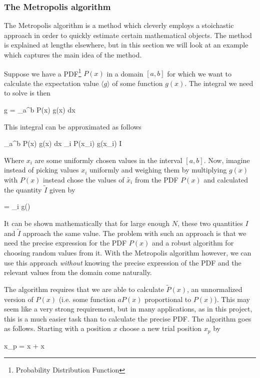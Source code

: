 \subsubsection{The Metropolis algorithm} \label{sec:theory_metropolis}

The Metropolis algorithm is a method which cleverly employs a stoichastic approach in order to quickly estimate certain mathematical objects.
The method is explained at lengths elsewhere\cite{lecturenotes}, but in this section we will look at an example which captures the main idea of the method.

Suppose we have a PDF\footnote{Probability Distribution Function} $P(x)$ in a domain $[a,b]$ for which we want to calculate the expectation value $\langle g \rangle$ of some function $g(x)$. 
The integral we need to solve is then 

\eqs
\langle g \rangle = \int_a^b P(x) g(x) dx 
\eqf

This integral can be approximated as follows

\eqs
\int_a^b P(x) g(x) dx \approx {} \sum_i P(x_i) g(x_i) \equiv I 
\eqf

Where $x_i$ are some uniformly chosen values in the interval $[a,b]$. 
Now, imagine instead of picking values $x_i$ uniformly and weighing them by multiplying $g(x)$ with $P(x)$ instead chose the values of $\tilde{x_i}$ from the PDF $P(x)$ and calculated the quantity $\tilde{I}$ given by

\eqs
{} =  \sum_i g()
\label{eq:metropolis_integral}
\eqf

It can be shown mathematically that for large enough $N$, these two quantities $I$ and $\tilde{I}$ approach the same value.  
The problem with such an approach is that we need the precise expression for the PDF $P(x)$ and a robust algorithm for choosing random values from it. 
With the Metropolis algorithm however, we can use this approach \textit{without} knowing the precise expression of the PDF and the relevant values from the domain come naturally. 

The algorithm requires that we are able to calculate $\tilde{P}(x)$, an unnormalized version of $P(x)$ (i.e. some function $aP(x)$ proportional to $P(x)$). 
This may seem like a very strong requirement, but in many applications, as in this project, this is a much easier task than to calculate the precise PDF. 
The algorithm goes as follows. 
Starting with a position $x$ choose a new trial position  $x_p$ by

\eqs x_p = x + \Delta x \eqf

